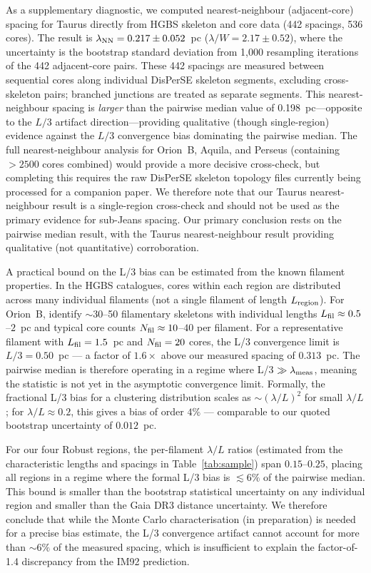 \documentclass[twoside,twocolumn]{mnras}
\begin{document}
As a supplementary diagnostic, we computed nearest-neighbour (adjacent-core) spacing
for Taurus directly from HGBS skeleton and core data (442 spacings, 536 cores).
The result is $\lambda_{\rm NN} = 0.217 \pm 0.052$~pc ($\lambda/W = 2.17 \pm 0.52$),
where the uncertainty is the bootstrap standard deviation from 1,000 resampling
iterations of the 442 adjacent-core pairs. These 442 spacings are measured between sequential cores along individual DisPerSE skeleton segments, excluding cross-skeleton pairs; branched junctions are treated as separate segments. This nearest-neighbour spacing is
\textit{larger} than the pairwise median value of 0.198~pc---opposite to the
$L/3$ artifact direction---providing qualitative (though single-region) evidence
against the $L/3$ convergence bias dominating the pairwise median.
The full nearest-neighbour analysis for Orion~B, Aquila, and Perseus (containing
$>2500$ cores combined) would provide a more decisive cross-check, but completing
this requires the raw DisPerSE skeleton topology files currently being processed for
a companion paper. We therefore note that our Taurus nearest-neighbour result is a
single-region cross-check and should not be used as the primary evidence for sub-Jeans
spacing. Our primary conclusion rests on the pairwise median result, with the Taurus
nearest-neighbour result providing qualitative (not quantitative) corroboration.

A practical bound on the L/3 bias can be estimated from the known filament properties. In the HGBS catalogues, cores within each region are distributed across many individual filaments (not a single filament of length $L_{\rm region}$). For Orion~B, \citet{Konyves2020} identify $\sim$30--50 filamentary skeletons with individual lengths $L_{\rm fil} \approx 0.5$--$2$~pc and typical core counts $N_{\rm fil} \approx 10$--$40$ per filament. For a representative filament with $L_{\rm fil} = 1.5$~pc and $N_{\rm fil} = 20$ cores, the L/3 convergence limit is $L/3 = 0.50$~pc --- a factor of $1.6\times$ above our measured spacing of $0.313$~pc. The pairwise median is therefore operating in a regime where L/3 $\gg \lambda_{\rm meas}$, meaning the statistic is not yet in the asymptotic convergence limit. Formally, the fractional L/3 bias for a clustering distribution scales as $\sim (\lambda/L)^2$ for small $\lambda/L$ \citep[see][]{Enoch2006}; for $\lambda/L \approx 0.2$, this gives a bias of order $4\%$ --- comparable to our quoted bootstrap uncertainty of $0.012$~pc.

For our four Robust regions, the per-filament $\lambda/L$ ratios (estimated from the characteristic lengths and spacings in Table~\ref{tab:sample}) span $0.15$--$0.25$, placing all regions in a regime where the formal L/3 bias is $\lesssim 6\%$ of the pairwise median. This bound is smaller than the bootstrap statistical uncertainty on any individual region and smaller than the Gaia DR3 distance uncertainty. We therefore conclude that while the Monte Carlo characterisation (in preparation) is needed for a precise bias estimate, the L/3 convergence artifact cannot account for more than $\sim 6\%$ of the measured spacing, which is insufficient to explain the factor-of-1.4 discrepancy from the IM92 prediction.
\end{document}
